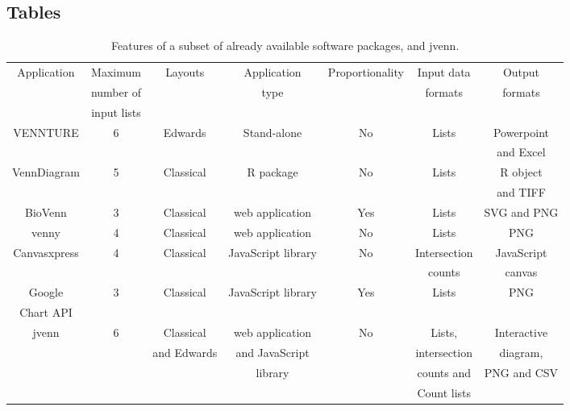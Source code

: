 \documentclass{bmcart}
\begin{document}
\begin{backmatter}

\section*{Tables}

\begin{table}[h!]
\caption{Features of a subset of already available software packages, and 
jvenn.}\label{table::features}
	\begin{tabular}{c|cccccc}
		Application & Maximum & Layouts & Application &
		Proportionality & Input data & Output\\ 
		& number of & & type & & formats & formats \\
		& input lists & & & & & \\ \hline
		
		VENNTURE \cite{Bronwen2012} &  6 & Edwards & Stand-alone & No & Lists &
		Powerpoint\\ 
		& & & & & & and Excel \\ \hline
		
		VennDiagram \cite{RVennDiagram} &  5 & Classical & R package & No & Lists
		& R object \\
		& & & & & & and TIFF \\ \hline
		
		BioVenn \cite{Hulsen2008} &  3 & Classical & web application & Yes &
		Lists & SVG and PNG \\ \hline
		
		venny \cite{venny} &  4 & Classical & web application & No &
		Lists & PNG \\ \hline
		 
		Canvasxpress \cite{canvasxpress} &  4 & Classical & JavaScript library &
		No & Intersection & JavaScript \\
		& & & & & counts & canvas \\ \hline
		
		Google & 3 & Classical & JavaScript library &
		Yes & Lists & PNG \\ 
		Chart API \cite{googleAPI} & & & & & & \\ \hline \hline
			
		jvenn & 6 & Classical & web application & No & Lists,
		& Interactive 
		\\
		& & and Edwards & and JavaScript & & intersection & diagram, \\
		& & & library & & counts and & PNG and CSV \\
		& & & & & Count lists & 
	\end{tabular}
\end{table}



\end{backmatter}
\end{document}
